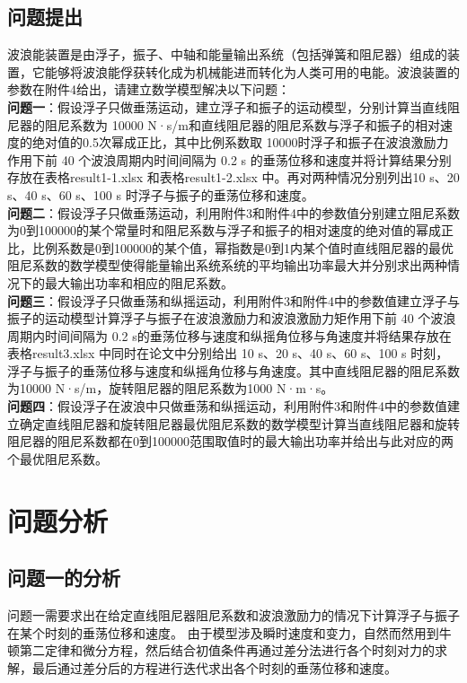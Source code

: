 \documentclass[a4paper,12pt]{article}
\begin{document}
	\subsection{问题提出}
	波浪能装置是由浮子，振子、中轴和能量输出系统（包括弹簧和阻尼器）组成的装置，它能够将波浪能俘获转化成为机械能进而转化为人类可用的电能。波浪装置的参数在附件4给出，请建立数学模型解决以下问题：\\
	\textbf{问题一}：假设浮子只做垂荡运动，建立浮子和振子的运动模型，分别计算当直线阻尼器的阻尼系数为 10000 N·s/m和直线阻尼器的阻尼系数与浮子和振子的相对速度的绝对值的0.5次幂成正比，其中比例系数取 10000时浮子和振子在波浪激励力作用下前 40 个波浪周期内时间间隔为 0.2 s 的垂荡位移和速度并将计算结果分别存放在表格result1-1.xlsx 和表格result1-2.xlsx 中。再对两种情况分别列出10 s、20 s、40 s、60 s、100 s 时浮子与振子的垂荡位移和速度。\\
	\textbf{问题二}：假设浮子只做垂荡运动，利用附件3和附件4中的参数值分别建立阻尼系数为0到100000的某个常量时和阻尼系数与浮子和振子的相对速度的绝对值的幂成正比，比例系数是0到100000的某个值，幂指数是0到1内某个值时直线阻尼器的最优阻尼系数的数学模型使得能量输出系统系统的平均输出功率最大并分别求出两种情况下的最大输出功率和相应的阻尼系数。\\
	\textbf{问题三}：假设浮子只做垂荡和纵摇运动，利用附件3和附件4中的参数值建立浮子与振子的运动模型计算浮子与振子在波浪激励力和波浪激励力矩作用下前 40 个波浪周期内时间间隔为 0.2 s的垂荡位移与速度和纵摇角位移与角速度并将结果存放在表格result3.xlsx 中同时在论文中分别给出 10 s、20 s、40 s、60 s、100 s 时刻，浮子与振子的垂荡位移与速度和纵摇角位移与角速度。其中直线阻尼器的阻尼系数为10000 N·s/m，旋转阻尼器的阻尼系数为1000 N·m·s。\\
	\textbf{问题四}：假设浮子在波浪中只做垂荡和纵摇运动，利用附件3和附件4中的参数值建立确定直线阻尼器和旋转阻尼器最优阻尼系数的数学模型计算当直线阻尼器和旋转阻尼器的阻尼系数都在0到100000范围取值时的最大输出功率并给出与此对应的两个最优阻尼系数。
	\section{问题分析}
	\subsection{问题一的分析}
	问题一需要求出在给定直线阻尼器阻尼系数和波浪激励力的情况下计算浮子与振子在某个时刻的垂荡位移和速度。
	由于模型涉及瞬时速度和变力，自然而然用到牛顿第二定律和微分方程，然后结合初值条件再通过差分法进行各个时刻对力的求解，最后通过差分后的方程进行迭代求出各个时刻的垂荡位移和速度。
\end{document}
